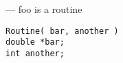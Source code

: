 \startmanpage
{}
--- foo is a routine  
\startvb\begin{verbatim}
Routine( bar, another )
double *bar;
int another;

\end{verbatim}
\endvb

\par
{}
\endmanpage
